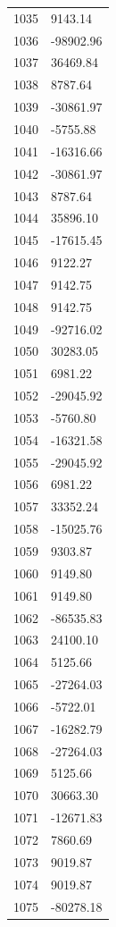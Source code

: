 \documentclass[a4paper,11pt]{article}
\begin{document}
\begin{center}
\begin{longtable}{|R{1.5cm}|R{2.5cm}|}
 1035 &      9143.14 \\
 1036 &    -98902.96 \\
 1037 &     36469.84 \\
 1038 &      8787.64 \\
 1039 &    -30861.97 \\
 1040 &     -5755.88 \\
 1041 &    -16316.66 \\
 1042 &    -30861.97 \\
 1043 &      8787.64 \\
 1044 &     35896.10 \\
 1045 &    -17615.45 \\
 1046 &      9122.27 \\
 1047 &      9142.75 \\
 1048 &      9142.75 \\
 1049 &    -92716.02 \\
 1050 &     30283.05 \\
 1051 &      6981.22 \\
 1052 &    -29045.92 \\
 1053 &     -5760.80 \\
 1054 &    -16321.58 \\
 1055 &    -29045.92 \\
 1056 &      6981.22 \\
 1057 &     33352.24 \\
 1058 &    -15025.76 \\
 1059 &      9303.87 \\
 1060 &      9149.80 \\
 1061 &      9149.80 \\
 1062 &    -86535.83 \\
 1063 &     24100.10 \\
 1064 &      5125.66 \\
 1065 &    -27264.03 \\
 1066 &     -5722.01 \\
 1067 &    -16282.79 \\
 1068 &    -27264.03 \\
 1069 &      5125.66 \\
 1070 &     30663.30 \\
 1071 &    -12671.83 \\
 1072 &      7860.69 \\
 1073 &      9019.87 \\
 1074 &      9019.87 \\
 1075 &    -80278.18 \\

\end{longtable}
\end{center}
\end{document}
